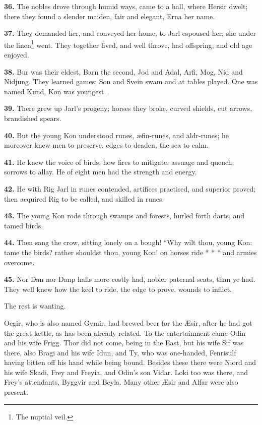 \textbf{36.} The nobles drove through humid ways, came to a hall, where
Hersir dwelt; there they found a slender maiden, fair and elegant,
Erna her name.

\textbf{37.} They demanded her, and conveyed her home, to Jarl espoused her;
she under the linen\footnote{The nuptial veil.} went. They together lived, and well throve,
had offspring, and old age enjoyed.

\textbf{38.} Bur was their eldest, Barn the second, Jod and Adal, Arfi, Mog,
Nid and Nidjung. They learned games; Son and Svein swam and at tables
played. One was named Kund, Kon was youngest.

\textbf{39.} There grew up Jarl's progeny; horses they broke, curved shields,
cut arrows, brandished spears.

\textbf{40.} But the young Kon understood runes, æfin-runes, and aldr-runes;
he moreover knew men to preserve, edges to deaden, the sea to calm.

\textbf{41.} He knew the voice of birds, how fires to mitigate, assuage and
quench; sorrows to allay. He of eight men had the strength and energy.

\textbf{42.} He with Rig Jarl in runes contended, artifices practised, and
superior proved; then acquired Rig to be called, and skilled in runes.

\textbf{43.} The young Kon rode through swamps and forests, hurled forth
darts, and tamed birds.

\textbf{44.} Then sang the crow, sitting lonely on a bough! ``Why wilt thou,
young Kon: tame the birds? rather shouldst thou, young Kon! on horses
ride * * * and armies overcome.

\textbf{45.} Nor Dan nor Danp halls more costly had, nobler paternal seats,
than ye had. They well knew how the keel to ride, the edge to prove,
wounds to inflict.

The rest is wanting.


Oegir, who is also named Gymir, had brewed beer for the Æsir, after he
had got the great kettle, as has been already related. To the
entertainment came Odin and his wife Frigg. Thor did not come, being
in the East, but his wife Sif was there, also Bragi and his wife Idun,
and Ty, who was one-handed, Fenrisulf having bitten off his hand while
being bound. Besides these there were Niord and his wife Skadi, Frey
and Freyia, and Odin's son Vidar. Loki too was there, and Frey's
attendants, Byggvir and Beyla. Many other Æsir and Alfar were also
present.

